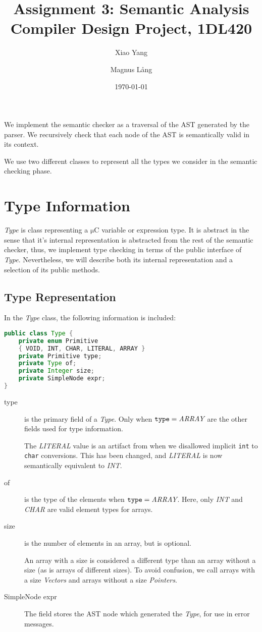 \documentclass[a4paper,11pt]{article}
\title{Assignment 3: Semantic Analysis \\
       Compiler Design Project, 1DL420}
\author{Xiao Yang \and Magnus L{\aa}ng} %
\date{\today}
\newcommand{\uC}{{$\mathrm{\mu}$}C }
\begin{document}
\maketitle

We implement the semantic checker as a traversal of the AST generated by the parser.
We recursively check that each node of the AST is semantically valid in its context.

We use two different classes to represent all the types we consider in the semantic checking phase.

\section{Type Information}
\emph{Type} is class representing a \uC variable or expression type.
It is abstract in the sense that it's internal representation is abstracted from the rest of the semantic checker, thus, we implement type checking in terms of the public interface of \emph{Type}.
Nevertheless, we will describe both its internal representation and a selection of its public methods.

\subsection{Type Representation}
In the \emph{Type} class, the following information is included:
\begin{lstlisting}[language=Java,morekeywords={enum}]
public class Type {
    private enum Primitive
    { VOID, INT, CHAR, LITERAL, ARRAY }
    private Primitive type;
    private Type of;
    private Integer size;
    private SimpleNode expr;
}
\end{lstlisting}
\begin{description}

\item[type] is the primary field of a \emph{Type}. Only when $\texttt{type}
  = \emph{ARRAY}$ are the other fields used for type information.

  The \emph{LITERAL} value is an artifact from when we disallowed implicit
  \texttt{int} to \texttt{char} conversions. This has been changed, and
  \emph{LITERAL} is now semantically equivalent to \emph{INT}.

\item[of] is the type of the elements when $\texttt{type} = \emph{ARRAY}$.
  Here, only \emph{INT} and \emph{CHAR} are valid element types for arrays.

\item[size] is the number of elements in an array, but is optional.

  An array with a size is considered a different type than an array without
  a size (as is arrays of different sizes). To avoid confusion, we call
  arrays with a size \emph{Vectors} and arrays without a size
  \emph{Pointers}.

\item[SimpleNode expr] The field stores the AST node which generated the
  \emph{Type}, for use in error messages.

\end{description}
\end{document}
